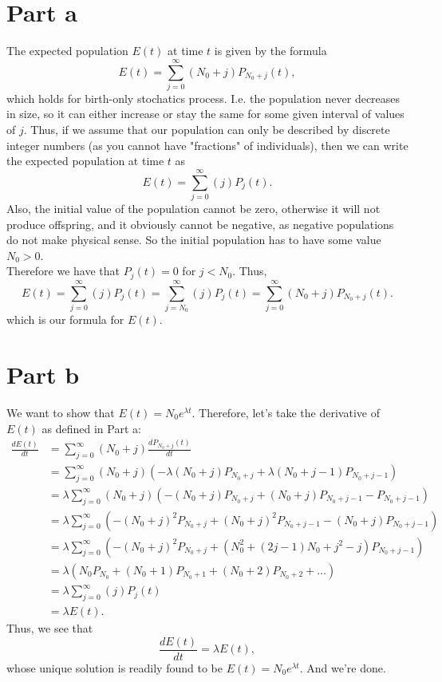 \section{Part a}
The expected population $E(t)$ at time $t$ is given by the formula
$$
E(t) = \sum_{j=0}^{\infty} (N_{0}+j)P_{N_{0}+j}(t),
$$
which holds for birth-only stochatics process. I.e. the population never decreases in size, so it can either increase or stay the same for some given interval of values of $j$. Thus, if we assume that our population can only be described by discrete integer numbers (as you cannot have "fractions" of individuals), then we can write the expected population at time $t$ as
$$
E(t) = \sum_{j=0}^{\infty}(j)P_{j}(t).
$$
Also, the initial value of the population cannot be zero, otherwise it will not produce offspring, and it obviously cannot be negative, as negative populations do not make physical sense. So the initial population has to have some value $N_{0} > 0$.\\
Therefore we have that $P_{j}(t) = 0$ for $j < N_{0}$. Thus, 
$$
E(t)=\sum_{j=0}^{\infty}(j)P_{j}(t)=\sum_{j=N_0}^{\infty}(j)P_{j}(t)=\sum_{j=0}^{\infty}(N_0+j)P_{N_0+j}(t).
$$
which is our formula for $E(t)$.

\section{Part b}
We want to show that $E(t)=N_0 e^{\lambda t}$. Therefore, let's take the derivative of $E(t)$ as defined in Part a:
\begin{align*}
\frac{dE(t)}{dt}&=\sum_{j=0}^{\infty}(N_0+j)\frac{dP_{N_0+j}(t)}{dt}\\
&=\sum_{j=0}^{\infty}(N_0+j)\left(-\lambda (N_0+j) P_{N_0+j} +\lambda (N_0+j-1) P_{N_0+j-1}\right)\\
&=\lambda \sum_{j=0}^{\infty}(N_0+j)\left(-(N_0+j) P_{N_0+j} + (N_0+j) P_{N_0+j-1}-P_{N_0+j-1}\right)\\
&=\lambda \sum_{j=0}^{\infty}\left(-(N_0+j)^2 P_{N_0+j} + (N_0+j)^2 P_{N_0+j-1}-(N_0+j)P_{N_0+j-1}\right)\\
&=\lambda \sum_{j=0}^{\infty}\left(-(N_0+j)^2 P_{N_0+j} + (N_0^2+(2j-1) N_0+j^2-j) P_{N_0+j-1}\right)\\
&=\lambda\left(N_0 P_{N_0}+(N_0+1) P_{N_0+1}+(N_0+2) P_{N_0+2}+\dots \right)\\
&= \lambda \sum_{j=0}^{\infty}(j)P_{j}(t)\\
&= \lambda E(t).
\end{align*}
Thus, we see that 
$$\frac{dE(t)}{dt}=\lambda E(t),
$$ 
whose unique solution is readily found to be $E(t)=N_0 e^{\lambda t}$. And we're done.

